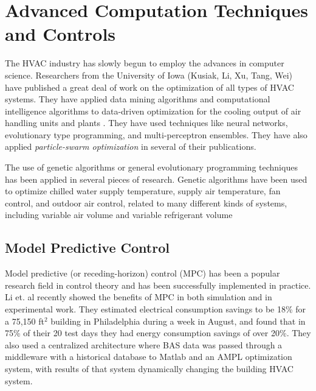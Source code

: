 \section{Advanced Computation Techniques and Controls}

The HVAC industry has slowly begun to employ the advances in computer
science. Researchers from the University of Iowa (Kusiak, Li, Xu, Tang,
Wei) have published a great deal of work on the optimization of all
types of HVAC systems. They have applied data mining algorithms and
computational intelligence algorithms to data-driven optimization for
the cooling output of air handling units and plants
\cite{Kusiak2014MinimizationOfEnergyConsumptionInHVAC, HeXiaofei2014,
Kusiak2013MinimizingEnergyConsumption,
Kusiak2012ModelingAndOptimizationOfHVAC, Kusiak2011MultiObjective,
Kusiak2010ReheatBox, WeiXiupeng2015,
WeiXiupeng2014ModelingAndOptimizationOfAChillerPlant, Kusiak2010,
Kusiak2010ModelingAndOptimization,
Kusiak2011OptimizationOfAnHVACSystemWithAStrength}. They have used
techniques like neural networks, evolutionary type programming, and
multi-perceptron ensembles. They have also applied
\textit{particle-swarm optimization} in several of their publications. 

The use of genetic algorithms or general evolutionary programming
techniques has been applied in several pieces of research. Genetic
algorithms have been used to optimize chilled water supply temperature,
supply air temperature, fan control, and outdoor air control, related to
many different kinds of systems, including variable air volume and
variable refrigerant volume
\cite{Fong2006HVACProgramming,Jin2005Prediction-basedSystems,Parameshwaran2010EnergyAlgorithm,Congradac2009HVACAlgorithms}

\subsection{Model Predictive Control}

Model predictive (or receding-horizon) control (MPC) has been a popular
research field in control theory and has been successfully implemented
in practice. Li et. al \cite{Li2015} recently showed the
benefits of MPC in both simulation and in experimental work. They
estimated electrical consumption savings to be 18\% for a 75,150
ft\(^2\) building in Philadelphia during a week in August, and found
that in 75\% of their 20 test days they had energy consumption savings
of over 20\%. They also used a centralized architecture where BAS data
was passed through a middleware with a historical database to Matlab and
an AMPL optimization system, with results of that system dynamically changing
the building HVAC system.

